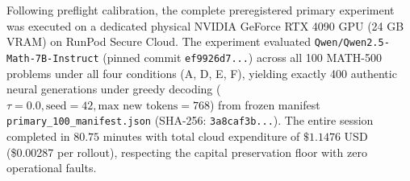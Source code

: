 \documentclass[11pt]{article}
\begin{document}
Following preflight calibration, the complete preregistered primary experiment was executed on a dedicated physical NVIDIA GeForce RTX 4090 GPU (24 GB VRAM) on RunPod Secure Cloud. The experiment evaluated \texttt{Qwen/Qwen2.5-Math-7B-Instruct} (pinned commit \texttt{ef9926d7...}) across all 100 MATH-500 problems under all four conditions (A, D, E, F), yielding exactly 400 authentic neural generations under greedy decoding ($\tau = 0.0, \text{seed} = 42, \text{max new tokens} = 768$) from frozen manifest \texttt{primary\_100\_manifest.json} (SHA-256: \texttt{3a8caf3b...}). The entire session completed in $80.75$ minutes with total cloud expenditure of $\$1.1476$ USD (\$0.00287 per rollout), respecting the capital preservation floor with zero operational faults.

\begin{table}[t]
\centering
\caption{\textbf{Authentic 400-Request Primary Experiment Results on MATH-500.} Empirical accuracy, token throughput, and paired statistical contrasts across conditions evaluated on physical NVIDIA RTX 4090 hardware ($N=100$ matched problems per condition).}
\label{tab:primary_400_results}
\end{table}
\end{document}
